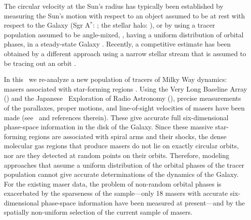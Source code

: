 The circular velocity at the Sun's radius has typically been
established by measuring the Sun's motion with respect to an object
assumed to be at rest with respect to the Galaxy (Sgr A$^*$:
\citealt{Reid04a}; the stellar halo: \citealt{Sirko04a}), or by using
a tracer population assumed to be angle-mixed, \ie, having a uniform
distribution of orbital phases, in a steady-state Galaxy
\citep[\eg,][]{Feast97a}. Recently, a competitive estimate has been
obtained by a different approach using a narrow stellar stream that is
assumed to be tracing out an orbit \citep{Koposov09a}.

In this \chaptername\ we re-analyze a new population of tracers of
Milky Way dynamics: masers associated with star-forming regions
\citep[\reid]{Reid09a}. Using the Very Long Baseline Array (\vlba) and
the Japanese \vlbi\ Exploration of Radio Astronomy (\vera), precise
measurements of the parallaxes, proper motions, and line-of-sight
velocities of masers have been made (see \reid\ and references
therein). These give accurate full six-dimensional phase-space
information in the disk of the Galaxy. Since these massive
star-forming regions are associated with spiral arms and their shocks,
the dense molecular gas regions that produce masers do not lie on
exactly circular orbits, nor are they detected at random points on
their orbits. Therefore, modeling approaches that assume a uniform
distribution of the orbital phases of the tracer population cannot
give accurate determinations of the dynamics of the Galaxy. For the
existing maser data, the problem of non-random orbital phases is
exacerbated by the sparseness of the sample---only 18 masers with
accurate six-dimensional phase-space information have been measured at
present---and by the spatially non-uniform selection of the current
sample of masers.

